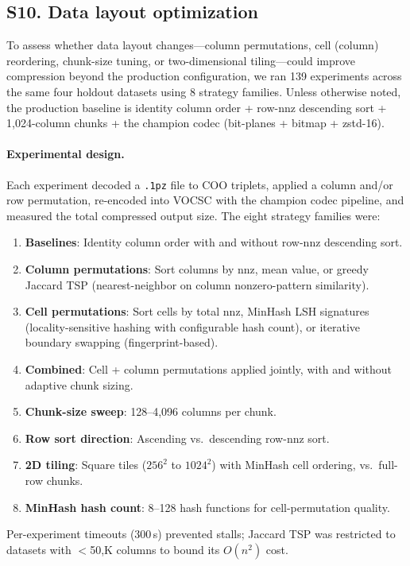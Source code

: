 \documentclass[10pt,twocolumn,letterpaper]{article}
\begin{document}
\subsection*{S10. Data layout optimization}
\label{sec:layout_opt}

To assess whether data layout changes---column permutations, cell (column) reordering, chunk-size tuning, or two-dimensional tiling---could improve compression beyond the production configuration, we ran 139 experiments across the same four holdout datasets using 8 strategy families.
Unless otherwise noted, the production baseline is identity column order + row-nnz descending sort + 1{,}024-column chunks + the champion codec (bit-planes + bitmap + zstd-16).

\paragraph{Experimental design.}
Each experiment decoded a \texttt{.1pz} file to COO triplets, applied a column and/or row permutation, re-encoded into VOCSC with the champion codec pipeline, and measured the total compressed output size.
The eight strategy families were:
\begin{enumerate}[label=(\Alph*)]
\item \textbf{Baselines}: Identity column order with and without row-nnz descending sort.
\item \textbf{Column permutations}: Sort columns by nnz, mean value, or greedy Jaccard TSP (nearest-neighbor on column nonzero-pattern similarity).
\item \textbf{Cell permutations}: Sort cells by total nnz, MinHash LSH signatures (locality-sensitive hashing with configurable hash count), or iterative boundary swapping (fingerprint-based).
\item \textbf{Combined}: Cell + column permutations applied jointly, with and without adaptive chunk sizing.
\item \textbf{Chunk-size sweep}: 128--4{,}096 columns per chunk.
\item \textbf{Row sort direction}: Ascending vs.\ descending row-nnz sort.
\item \textbf{2D tiling}: Square tiles ($256^2$ to $1024^2$) with MinHash cell ordering, vs.\ full-row chunks.
\item \textbf{MinHash hash count}: 8--128 hash functions for cell-permutation quality.
\end{enumerate}
Per-experiment timeouts (300\,s) prevented stalls; Jaccard TSP was restricted to datasets with $<$50{,}K columns to bound its $O(n^2)$ cost.
\end{document}
